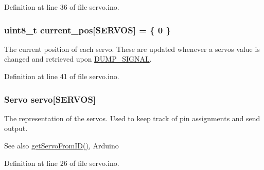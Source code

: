 Definition at line 36 of file servo.\+ino.

\hypertarget{servo_8ino_ae88c6e452cc6a2dc7af59897c42d8e1e}{}
\subsubsection[{current\+\_\+pos}]{\setlength{\rightskip}{0pt plus 5cm}uint8\+\_\+t current\+\_\+pos\mbox{[}{\bf S\+E\+R\+V\+O\+S}\mbox{]} = \{ 0 \}}\label{servo_8ino_ae88c6e452cc6a2dc7af59897c42d8e1e}
The current position of each servo. These are updated whenever a servos value is changed and retrieved upon \hyperlink{servo_8ino_a99fb83031ce9923c84392b4e92f956b5a31cd671c80d04a4acc2d8256ec960c90}{D\+U\+M\+P\+\_\+\+S\+I\+G\+N\+A\+L}. 

Definition at line 41 of file servo.\+ino.

\hypertarget{servo_8ino_adf02be48d17da3f4a229ebfdfda2fa71}{}
\subsubsection[{servo}]{\setlength{\rightskip}{0pt plus 5cm}Servo servo\mbox{[}{\bf S\+E\+R\+V\+O\+S}\mbox{]}}\label{servo_8ino_adf02be48d17da3f4a229ebfdfda2fa71}
The representation of the servos. Used to keep track of pin assignments and send output. \begin{DoxySeeAlso}{See also}
\hyperlink{rhand_8h_a13edec01163cd92d516634c36fe06aeb}{get\+Servo\+From\+I\+D()}, Arduino 
\end{DoxySeeAlso}


Definition at line 26 of file servo.\+ino.

